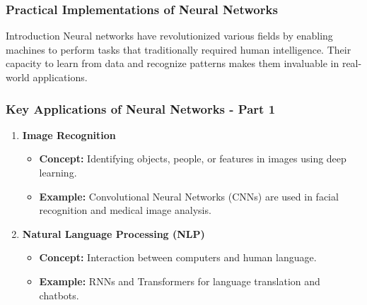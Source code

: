 \documentclass[aspectratio=169]{beamer}
\begin{document}
\begin{frame}[fragile]
    \frametitle{Practical Implementations of Neural Networks}
    \begin{block}{Introduction}
        Neural networks have revolutionized various fields by enabling machines to perform tasks that traditionally required human intelligence. Their capacity to learn from data and recognize patterns makes them invaluable in real-world applications.
    \end{block}
\end{frame}

\begin{frame}[fragile]
    \frametitle{Key Applications of Neural Networks - Part 1}
    \begin{enumerate}
        \item \textbf{Image Recognition}
        \begin{itemize}
            \item \textbf{Concept:} Identifying objects, people, or features in images using deep learning.
            \item \textbf{Example:} Convolutional Neural Networks (CNNs) are used in facial recognition and medical image analysis.
        \end{itemize}
        
        \item \textbf{Natural Language Processing (NLP)}
        \begin{itemize}
            \item \textbf{Concept:} Interaction between computers and human language.
            \item \textbf{Example:} RNNs and Transformers for language translation and chatbots.
        \end{itemize}
    \end{enumerate}
\end{frame}
\end{document}
